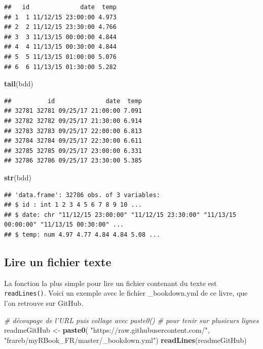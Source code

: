 \documentclass[twoside,symmetric]{book}
\newenvironment{Shaded}{}{}
\newcommand{\CommentTok}[1]{\textit{#1}}
\newcommand{\KeywordTok}[1]{\textbf{#1}}
\newcommand{\NormalTok}[1]{#1}
\newcommand{\StringTok}[1]{#1}
\begin{document}
\begin{verbatim}
##   id              date  temp
## 1  1 11/12/15 23:00:00 4.973
## 2  2 11/12/15 23:30:00 4.766
## 3  3 11/13/15 00:00:00 4.844
## 4  4 11/13/15 00:30:00 4.844
## 5  5 11/13/15 01:00:00 5.076
## 6  6 11/13/15 01:30:00 5.282
\end{verbatim}

\begin{Shaded}
\begin{Highlighting}[]
\KeywordTok{tail}\NormalTok{(bdd)}
\end{Highlighting}
\end{Shaded}

\begin{verbatim}
##          id              date  temp
## 32781 32781 09/25/17 21:00:00 7.091
## 32782 32782 09/25/17 21:30:00 6.914
## 32783 32783 09/25/17 22:00:00 6.813
## 32784 32784 09/25/17 22:30:00 6.611
## 32785 32785 09/25/17 23:00:00 6.331
## 32786 32786 09/25/17 23:30:00 5.385
\end{verbatim}

\begin{Shaded}
\begin{Highlighting}[]
\KeywordTok{str}\NormalTok{(bdd)}
\end{Highlighting}
\end{Shaded}

\begin{verbatim}
## 'data.frame': 32786 obs. of 3 variables:
## $ id : int 1 2 3 4 5 6 7 8 9 10 ...
## $ date: chr "11/12/15 23:00:00" "11/12/15 23:30:00" "11/13/15
00:00:00" "11/13/15 00:30:00" ...
## $ temp: num 4.97 4.77 4.84 4.84 5.08 ...
\end{verbatim}

\hypertarget{l016readTXT}{%
\subsection{Lire un fichier texte}\label{l016readTXT}}

La fonction la plus simple pour lire un fichier contenant du texte est \texttt{readLines()}. Voici un exemple avec le fichier \_bookdown.yml de ce livre, que l'on retrouve sur GitHub.

\begin{Shaded}
\begin{Highlighting}[]
\CommentTok{# découpage de l'URL puis collage avec paste0() }
\CommentTok{# pour tenir sur plusieurs lignes}
\NormalTok{readmeGitHub <-}\StringTok{ }\KeywordTok{paste0}\NormalTok{(}
  \StringTok{"https://raw.githubusercontent.com/"}\NormalTok{, }
  \StringTok{"frareb/myRBook_FR/master/_bookdown.yml"}\NormalTok{)}
\KeywordTok{readLines}\NormalTok{(readmeGitHub)}
\end{Highlighting}
\end{Shaded}
\end{document}
